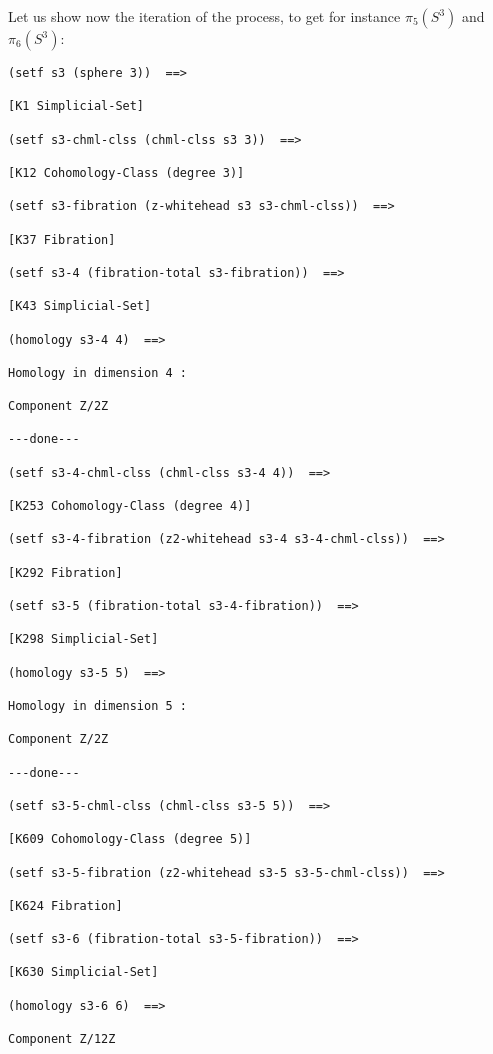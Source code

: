 Let us show now the iteration of the process, to get for instance
$\pi_5(S^3)$ and $\pi_6(S^3)$:
{\footnotesize\begin{verbatim}
(setf s3 (sphere 3))  ==>

[K1 Simplicial-Set]

(setf s3-chml-clss (chml-clss s3 3))  ==>

[K12 Cohomology-Class (degree 3)]

(setf s3-fibration (z-whitehead s3 s3-chml-clss))  ==>

[K37 Fibration]

(setf s3-4 (fibration-total s3-fibration))  ==>

[K43 Simplicial-Set]

(homology s3-4 4)  ==>

Homology in dimension 4 :

Component Z/2Z

---done---

(setf s3-4-chml-clss (chml-clss s3-4 4))  ==>

[K253 Cohomology-Class (degree 4)]

(setf s3-4-fibration (z2-whitehead s3-4 s3-4-chml-clss))  ==>

[K292 Fibration]

(setf s3-5 (fibration-total s3-4-fibration))  ==>

[K298 Simplicial-Set]

(homology s3-5 5)  ==>

Homology in dimension 5 :

Component Z/2Z

---done---

(setf s3-5-chml-clss (chml-clss s3-5 5))  ==>

[K609 Cohomology-Class (degree 5)]

(setf s3-5-fibration (z2-whitehead s3-5 s3-5-chml-clss))  ==>

[K624 Fibration]

(setf s3-6 (fibration-total s3-5-fibration))  ==>

[K630 Simplicial-Set]

(homology s3-6 6)  ==>

Component Z/12Z
\end{verbatim}}

